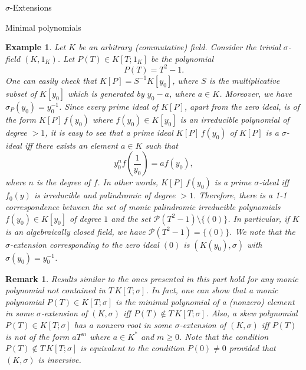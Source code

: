 \documentclass[11pt,a4paper]{article}
\theoremstyle{theorem}
\newtheorem{example}{Example}[section]
\newtheorem{remark}{Remark}[section]
\numberwithin{equation}{section}
\newcommand{\s}{\sigma}
\begin{document}
\begin{section}{$\s$-Extensions}
\begin{subsection}{Minimal polynomials}
		\begin{example}
			Let $K$ be an arbitrary (commutative) field. Consider the trivial $\s$-field $(K,1_K)$. Let $P(T)\in K[T;1_K]$ be the polynomial
			$$P(T)=T^2-1.$$
			One can easily check that $K[P]=S^{-1}K[y_0]$, where $S$ is the multiplicative subset of $K[y_0]$ which is generated by $y_0-a$, where $a\in K$. Moreover, we have $\s_P(y_0)=y_0^{-1}$. 
			Since every prime ideal of $K[P]$, apart from the zero ideal, is of the form $K[P]\,f(y_0)$ where $f(y_0)\in K[y_0]$ is an irreducible polynomial of degree $>1$, it is easy to see that a prime ideal $K[P]\,f(y_0)$ of  $K[P]$ is  a $\s$-ideal iff there exists an element $a\in K$ such that
			$$y_0^nf(\frac{1}{y_0})=af(y_0),$$ where $n$ is the degree of $f$. In other words, $K[P]\,f(y_0)$ is a prime $\s$-ideal iff $f_0(y)$ is irreducible and palindromic of degree $>1$.  Therefore, there is a 1-1 correspondence between the set of monic palindromic irreducible polynomials $f(y_0)\in K[y_0]$ of degree $1$ and the set  $\mathcal{P}(T^2-1)\setminus \{(0)\}$. In particular, if $K$ is an algebraically closed field, we have $\mathcal{P}(T^2-1)= \{(0)\}$. We note that the $\s$-extension corresponding to the zero ideal $(0)$ is $(K(y_0),\s)$ with $\s(y_0)=y_0^{-1}$.   
		\end{example}     
		
		\begin{remark}\label{(R)GeneralP}
		Results similar to the ones presented in this part hold for any monic polynomial not contained in $T\, K[T;\s]$. In fact, one can show that a monic polynomial   $P(T)\in K[T;\s]$ is the minimal polynomial of a (nonzero) element in some $\s$-extension of $(K,\s)$  iff $P(T)\notin T\, K[T;\s]$. Also,  a skew polynomial $P(T)\in K[T;\sigma]$ has a nonzero root in some $\s$-extension  of $(K,\s)$ iff $P(T)$ is not of the form $aT^m$ where $a\in K^*$ and $m\geq 0$. Note that the condition  $P(T)\notin T\, K[T;\s]$ is equivalent to the condition $P(0)\neq 0$ provided that $(K,\s)$ is inversive. 
		\end{remark}

\end{subsection}

\end{section} 
\end{document}
